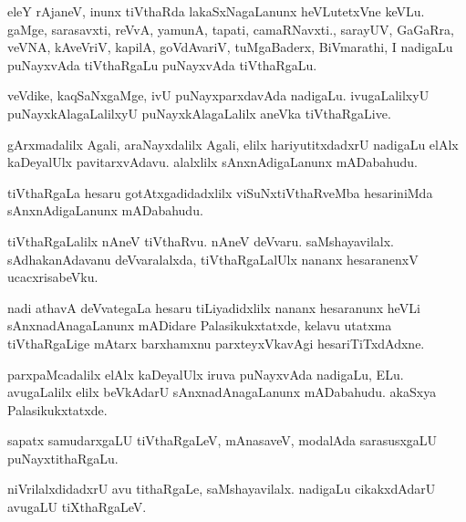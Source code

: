 \documentclass{article}
\begin{document}
\begin{mn}
eleY rAjaneV,  inunx tiVthaRda lakaSxNagaLanunx heVLutetxVne keVLu.  gaMge, sarasavxti, 
reVvA, yamunA, tapati, camaRNavxti., sarayUV, GaGaRra, veVNA, kAveVriV, kapilA, goVdAvariV, 
tuMgaBaderx, BiVmarathi, I nadigaLu puNayxvAda tiVthaRgaLu puNayxvAda tiVthaRgaLu.
\end{mn}

\begin{mn}
veVdike, kaqSaNxgaMge,  ivU puNayxparxdavAda nadigaLu.  ivugaLalilxyU puNayxkAlagaLalilxyU 
puNayxkAlagaLalilx aneVka tiVthaRgaLive.
\end{mn}

\begin{mn}
gArxmadalilx  Agali, araNayxdalilx Agali,  elilx hariyutitxdadxrU nadigaLu elAlx kaDeyalUlx 
pavitarxvAdavu.  alalxlilx  sAnxnAdigaLanunx mADabahudu.
\end{mn}

\begin{mn}
tiVthaRgaLa hesaru gotAtxgadidadxlilx viSuNxtiVthaRveMba hesariniMda  sAnxnAdigaLanunx mADabahudu.
\end{mn}

\begin{mn}
tiVthaRgaLalilx nAneV tiVthaRvu.  nAneV deVvaru.  saMshayavilalx. sAdhakanAdavanu 
deVvaralalxda, tiVthaRgaLalUlx nananx hesaranenxV ucacxrisabeVku.
\end{mn}

\begin{mn}
nadi athavA deVvategaLa hesaru  tiLiyadidxlilx  nananx hesaranunx  heVLi sAnxnadAnagaLanunx 
mADidare Palasikukxtatxde,  kelavu utatxma tiVthaRgaLige mAtarx barxhamxnu parxteyxVkavAgi hesariTiTxdAdxne.
\end{mn}

\begin{mn}
parxpaMcadalilx elAlx kaDeyalUlx iruva puNayxvAda nadigaLu, ELu.  avugaLalilx elilx beVkAdarU  
sAnxnadAnagaLanunx mADabahudu. akaSxya Palasikukxtatxde.
\end{mn}

\begin{mn}
sapatx samudarxgaLU tiVthaRgaLeV, mAnasaveV, modalAda sarasusxgaLU puNayxtithaRgaLu.
\end{mn}

\begin{mn}
niVrilalxdidadxrU avu tithaRgaLe, saMshayavilalx. nadigaLu  cikakxdAdarU avugaLU tiXthaRgaLeV.
\end{mn}
\end{document}
